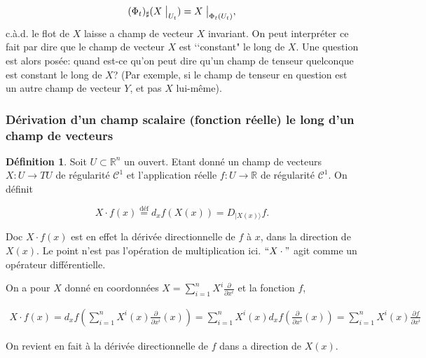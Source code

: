 \documentclass[french]{article}
\theoremstyle{definition}
\newtheorem{protodefinition}{Définition}[section]
\newenvironment{definition}
    {\colorlet{shadecolor}{green!5}\begin{shaded}\begin{protodefinition}}
    {\end{protodefinition}\end{shaded}}
\begin{document}
\begin{equation}\label{cond_ch_tens}
  (\Phi_t)_{\sharp}(X \bigm|_{U_t}) = X \bigm|_{\Phi_t(U_t)},
\end{equation} c.\`a.d. le flot de $X$ laisse a champ de vecteur $X$ invariant. On peut interpr\'eter  ce fait par dire que le champ de vecteur $X$ est \lq \lq constant" le long de $X$. Une question est alors pos\'ee: quand est-ce qu'on peut dire qu'un champ de tenseur quelconque est constant le  long de $X$? (Par exemple, si le champ de tenseur en question est un autre champ de vecteur $Y$, et pas $X$ lui-m\^eme).



\subsubsection{D\'erivation  d'un champ scalaire (fonction r\'eelle) le long d'un champ de vecteurs}

\begin{definition}

  Soit \(U \subset \mathbb{R}^n\) un ouvert.
  Etant donné un champ de vecteurs \(X : U \longrightarrow T U\) de régularité \(\mathcal{C}^1\) et l'application r\'eelle \(f : U \longrightarrow \mathbb{R}\) de régularité \(\mathcal{C}^1\). On définit

  \[X \cdot f(x) \stackrel{\text{déf}}{=} d_x f(X(x)) = D _{\mid X(x) \rangle} f.\]


Doc $X\cdot f(x) $ est en effet la d\'eriv\'ee directionnelle de $f$ \`a $x$, dans la direction de $X(x)$.    {\selectfont{}\relax} Le point n'est pas l'opération de multiplication ici. $\lq \lq X\cdot"$ agit comme un op\'erateur diff\'erentielle.

  On a pour  \(X\) donn\'e en coordonnées  \(X =\displaystyle \sum_{i=1}^{n} X ^{i}\displaystyle \frac{\partial  }{\partial x ^{i}}\) et la fonction  \(f\),


  \begin{gather*}
    X \cdot f(x) = d_x f \left(\sum_{i=1}^{n} X ^{i}(x) \frac{\partial  }{\partial x ^{i}}(x) \right) = \sum_{i=1}^{n}X ^{i}(x)d_xf \left(\frac{\partial  }{\partial x ^{i}}(x) \right) = \sum_{i=1}^{n} X ^{i}(x) \frac{\partial f }{\partial x ^{i}}
  \end{gather*}

On revient en fait à la dérivée directionnelle de \(f\)  dans a direction de $X(x)$.
\end{definition}
\end{document}

